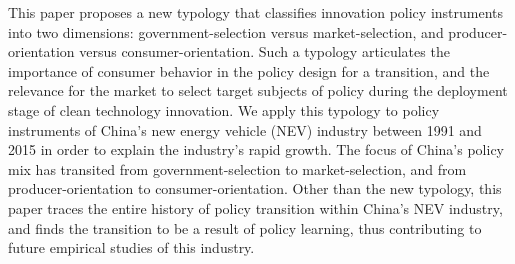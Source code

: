 This paper proposes a new typology that classifies innovation policy instruments into two dimensions: government-selection versus market-selection, and producer-orientation versus consumer-orientation. Such a typology articulates the importance of consumer behavior in the policy design for a transition, and the relevance for the market to select target subjects of policy during the deployment stage of clean technology innovation. We apply this typology to policy instruments of China's new energy vehicle (NEV) industry between 1991 and 2015 in order to explain the industry's rapid growth. The focus of China's policy mix has transited from government-selection to market-selection, and from producer-orientation to consumer-orientation. Other than the new typology, this paper traces the entire history of policy transition within China's NEV industry, and finds the transition to be a result of policy learning, thus contributing to future empirical studies of this industry.